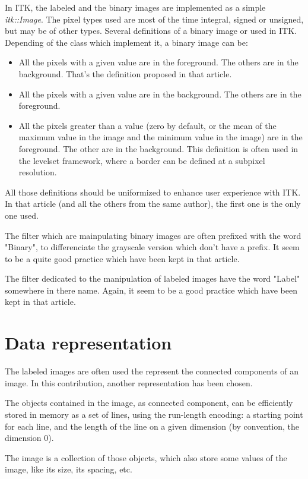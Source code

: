 \documentclass{InsightArticle}
\begin{document}
In ITK, the labeled and the binary images are implemented as a simple {\em
itk::Image}. The pixel types used are most of the time integral, signed or
unsigned, but may be of other types.
Several definitions of a binary image or used in ITK. Depending of the class
which implement it, a binary image can be:
\begin{itemize}
  \item All the pixels with a given value are in the foreground. The others are
in the background. That's the definition proposed in that article.
  \item All the pixels with a given value are in the background. The others are
in the foreground.
  \item All the pixels greater than a value (zero by default, or the mean of the maximum value in the image
and the minimum value in the image) are in the foreground. The other are in the
background. This definition is often used in the levelset framework, where a border
can be defined at a subpixel resolution.
\end{itemize}
All those definitions should be uniformized to enhance user experience with ITK.
In that article (and all the others from the same author), the first one is the
only one used.

The filter which are mainpulating binary images are often prefixed with the word
"Binary", to differenciate the grayscale version which don't have a prefix. It
seem to be a quite good practice which have been kept in that article.

The filter dedicated to the manipulation of labeled images have the word "Label"
somewhere in there name. Again, it seem to be a good practice which have been
kept in that article.


\section{Data representation}

The labeled images are often used the represent the connected components of an
image. In this contribution, another representation has been chosen.

The objects contained in the image, as connected component, can be efficiently stored in memory as a set
of lines, using the run-length encoding: a starting point for each line, and the
length of the line on a given dimension (by convention, the dimension 0).

The image is a collection of those objects, which also store some values of the image, like its size, its spacing, etc.
\end{document}

